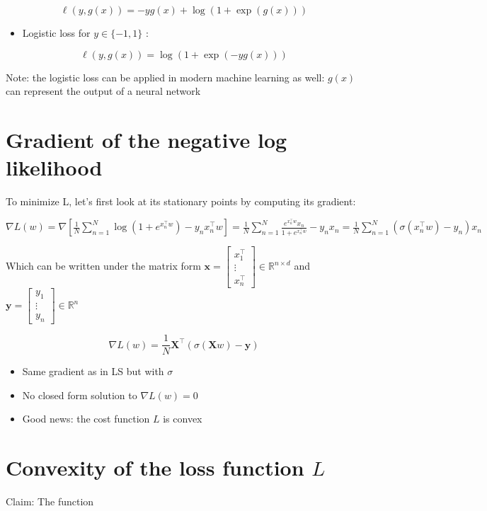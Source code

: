 \documentclass[10pt]{article}
\begin{document}
$$
\ell(y, g(x))=-y g(x)+\log (1+\exp (g(x)))
$$

\begin{itemize}
  \item Logistic loss for $y \in\{-1,1\}$ :
\end{itemize}

$$
\ell(y, g(x))=\log (1+\exp (-y g(x)))
$$

Note: the logistic loss can be applied in modern machine learning as well: $g(x)$ can represent the output of a neural network

\section*{Gradient of the negative log likelihood}
To minimize L, let's first look at its stationary points by computing its gradient:

$\nabla L(w)=\nabla\left[\frac{1}{N} \sum_{n=1}^{N} \log \left(1+e^{x_{n}^{\top} w}\right)-y_{n} x_{n}^{\top} w\right]=\frac{1}{N} \sum_{n=1}^{N} \frac{e^{x_{n}^{\top} w} x_{n}}{1+e^{x_{n}^{\top} w}}-y_{n} x_{n}=\frac{1}{N} \sum_{n=1}^{N}\left(\sigma\left(x_{n}^{\top} w\right)-y_{n}\right) x_{n}$

Which can be written under the matrix form $\mathbf{x}=\left[\begin{array}{c}x_{1}^{\top} \\ \vdots \\ x_{n}^{\top}\end{array}\right] \in \mathbb{R}^{n \times d}$ and $\mathbf{y}=\left[\begin{array}{c}y_{1} \\ \vdots \\ y_{n}\end{array}\right] \in \mathbb{R}^{n}$

$$
\nabla L(w)=\frac{1}{N} \mathbf{X}^{\top}(\sigma(\mathbf{X} w)-\mathbf{y})
$$

\begin{itemize}
  \item Same gradient as in LS but with $\sigma$
  \item No closed form solution to $\nabla L(w)=0$
  \item Good news: the cost function $L$ is convex
\end{itemize}

\section*{Convexity of the loss function $L$}
Claim: The function
\end{document}
